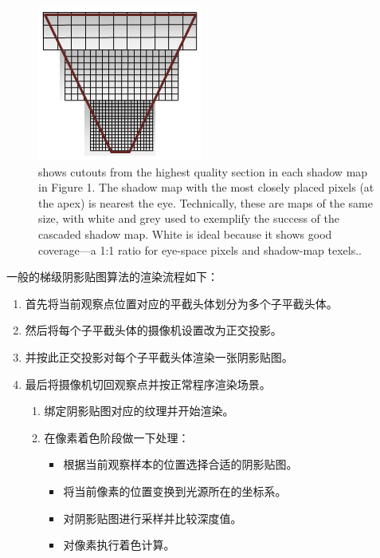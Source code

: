 \begin{figure}
	\includegraphics[width=\textwidth]{figures/shadows/cascaded-shadow-map}
	\caption{shows cutouts from the highest quality section in each shadow map in Figure 1. The shadow map with the most closely placed pixels (at the apex) is nearest the eye. Technically, these are maps of the same size, with white and grey used to exemplify the success of the cascaded shadow map. White is ideal because it shows good coverage—a 1:1 ratio for eye-space pixels and shadow-map texels..}
	\label{f:df-cascaded-shadow-map}
\end{figure}

一般的梯级阴影贴图算法的渲染流程如下：

\begin{enumerate}
	\item 首先将当前观察点位置对应的平截头体划分为多个子平截头体。 
	\item 然后将每个子平截头体的摄像机设置改为正交投影。
	\item 并按此正交投影对每个子平截头体渲染一张阴影贴图。
	\item 最后将摄像机切回观察点并按正常程序渲染场景。
	
	\begin{enumerate}
		\item 绑定阴影贴图对应的纹理并开始渲染。 
		\item 在像素着色阶段做一下处理：
		\begin{itemize}
			\item 根据当前观察样本的位置选择合适的阴影贴图。 
			\item 将当前像素的位置变换到光源所在的坐标系。
			\item 对阴影贴图进行采样并比较深度值。
			\item 对像素执行着色计算。
		\end{itemize}
	\end{enumerate}
\end{enumerate}


